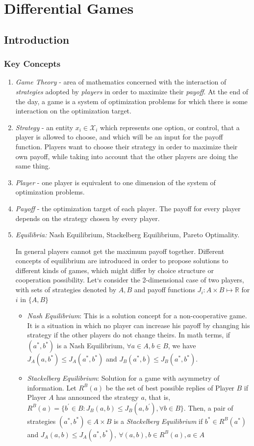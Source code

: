 \section{Differential Games}
\subsection{Introduction}
\subsubsection{Key Concepts}
\begin{enumerate}
    \item \textit{Game Theory} - area of mathematics concerned with the interaction of \textit{strategies} adopted by \textit{players} in order to maximize their \textit{payoff}. At the end of the day, a game is a system of optimization problems for which there is some interaction on the optimization target.
    \item \textit{Strategy} - an entity $x_i \in \mathcal{X}_i$ which represents one option, or control, that a player is allowed to choose, and which will be an input for the payoff function. Players want to choose their strategy in order to maximize their own payoff, while taking into account that the other players are doing the same thing.
    \item \textit{Player} - one player is equivalent to one dimension of the system of optimization problems.
    \item \textit{Payoff} - the optimization target of each player. The payoff for every player depends on the strategy chosen by every player.
    \item \textit{Equilibria:} Nash Equilibrium, Stackelberg Equilibrium, Pareto Optimality.
        
        In general players cannot get the maximum payoff together. Different concepts of equilibrium are introduced in order to propose solutions to different kinds of games, which might differ by choice structure or cooperation possibility. Let`s consider the 2-dimensional case of two players, with sets of strategies denoted by $A,B$ and payoff functions $J_i: A\times B \mapsto \mathbb{R}$ for $i$ in $\{A,B\}$
    \begin{itemize}
        \item \textit{Nash Equilibrium}: This is a solution concept for a non-cooperative game. It is a situation in which no player can increase his payoff by changing his strategy if the other players do not change theirs. In math terms, if $(a^*,b^*)$ is a Nash Equilibrium, $\forall a \in A, b\in B$, we have $J_A(a,b^*) \leq J_A(a^*,b^*)$ and $J_B(a^*,b) \leq J_B(a^*,b^*)$. 
        \item \textit{Stackelberg Equilibrium}: Solution for a game with asymmetry of information. Let $R^B(a)$ be the set of best possible replies of Player $B$ if Player $A$ has announced the strategy $a$, that is, $R^B(a) = \{b^' \in B : J_B(a,b) \leq J_B(a,b^'), \forall b \in B\}$. Then, a pair of strategies $(a^*,b^*) \in A\times B$ is a \textit{Stackelberg Equilibrium} if $b^* \in R^B(a^*)$ and $J_A(a,b)\leq J_A(a^*, b^*),\ \forall(a,b), b\in R^B(a), a \in A$
    \end{itemize}
    

\end{enumerate}
